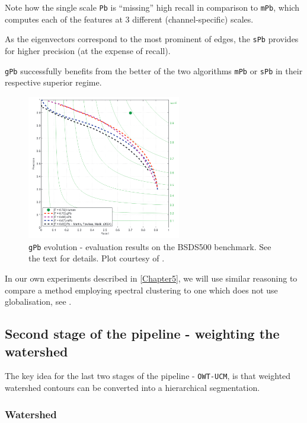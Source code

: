 Note how the single scale {\tt Pb} is ``missing'' high recall in comparison to {\tt mPb}, which computes each of the features at 3 different (channel-specific) scales. 

As the eigenvectors correspond to the most prominent of edges, the {\tt sPb} provides for higher precision (at the expense of recall). 

{\tt gPb} successfully benefits from the better of the two algorithms {\tt mPb} or {\tt sPb} in their respective superior regime.

\begin{figure}[t]
 \centering
 \includegraphics[width=0.6\textwidth]{images/gPb-OWT-UCM/Pb_mPb_sPb_gPb.png}
 \caption[{\tt gPb} evolution - plot results on the BSDS500 benchmark.]{{\tt gPb} evolution - evaluation results on the BSDS500 benchmark. See the text for details. Plot courtesy of \cite{Arbelaez11}.}
 \label{fig:Pb_mPb_sPb_gPb}
\end{figure}

In our own experiments described in \cref{Chapter5}, we will use similar reasoning to compare a method employing spectral clustering to one which does not use globalisation, see .

\subsection{Second stage of the pipeline - weighting the watershed} %
The key idea for the last two stages %
of the pipeline - {\tt OWT-UCM}, is that weighted watershed contours can be converted into a hierarchical segmentation.

\subsubsection{Watershed}
\label{sec:ch3-watershed}

